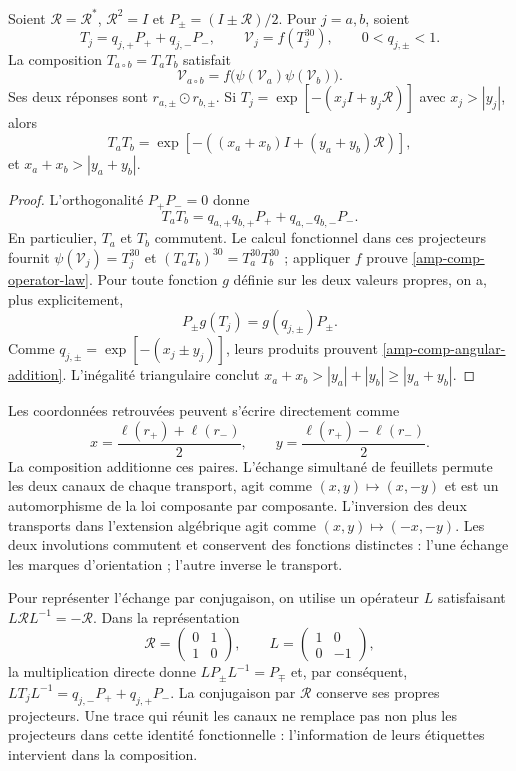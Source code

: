 \begin{proposition}
\label{amp-comp-operator}
Soient $\mathcal R=\mathcal R^*$, $\mathcal R^2=I$ et
$P_\pm=(I\pm\mathcal R)/2$. Pour $j=a,b$, soient
\[
 T_j=q_{j,+}P_++q_{j,-}P_-,\qquad
 \mathcal V_j=f(T_j^{30}),\qquad 0<q_{j,\pm}<1.
\]
La composition $T_{a\circ b}=T_aT_b$ satisfait
\begin{equation}
 \mathcal V_{a\circ b}
 =f\bigl(\psi(\mathcal V_a)\psi(\mathcal V_b)\bigr).
 \label{amp-comp-operator-law}
\end{equation}
Ses deux réponses sont $r_{a,\pm}\odot r_{b,\pm}$. Si
$T_j=\exp[-(x_jI+y_j\mathcal R)]$ avec $x_j>|y_j|$, alors
\begin{equation}
 T_aT_b=
 \exp[-((x_a+x_b)I+(y_a+y_b)\mathcal R)],
 \label{amp-comp-angular-addition}
\end{equation}
et $x_a+x_b>|y_a+y_b|$.
\end{proposition}
\begin{proof}
L’orthogonalité $P_+P_-=0$ donne
\[
 T_aT_b=q_{a,+}q_{b,+}P_++q_{a,-}q_{b,-}P_-.
\]
En particulier, $T_a$ et $T_b$ commutent. Le calcul fonctionnel dans ces
projecteurs fournit
$\psi(\mathcal V_j)=T_j^{30}$ et
$(T_aT_b)^{30}=T_a^{30}T_b^{30}$ ; appliquer $f$ prouve
\eqref{amp-comp-operator-law}. Pour toute fonction $g$ définie sur les
deux valeurs propres, on a, plus explicitement,
\[
 P_\pm g(T_j)=g(q_{j,\pm})P_\pm.
\]
Comme $q_{j,\pm}=\exp[-(x_j\pm y_j)]$, leurs produits prouvent
\eqref{amp-comp-angular-addition}. L’inégalité triangulaire conclut
$x_a+x_b>|y_a|+|y_b|\geq|y_a+y_b|$.
\end{proof}

Les coordonnées retrouvées peuvent s’écrire directement comme
\[
 x=\frac{\ell(r_+)+\ell(r_-)}2,\qquad
 y=\frac{\ell(r_+)-\ell(r_-)}2.
\]
La composition additionne ces paires. L’échange simultané de feuillets
permute les deux canaux de chaque transport, agit comme
$(x,y)\mapsto(x,-y)$ et est un automorphisme de la loi composante par
composante. L’inversion des deux transports dans l’extension algébrique
agit comme $(x,y)\mapsto(-x,-y)$. Les deux involutions commutent et
conservent des fonctions distinctes : l’une échange les marques d’orientation ;
l’autre inverse le transport.

Pour représenter l’échange par conjugaison, on utilise un
opérateur $L$ satisfaisant $L\mathcal R L^{-1}=-\mathcal R$. Dans la
représentation
\[
 \mathcal R=\begin{pmatrix}0&1\\1&0\end{pmatrix},\qquad
 L=\begin{pmatrix}1&0\\0&-1\end{pmatrix},
\]
la multiplication directe donne $LP_\pm L^{-1}=P_\mp$ et, par conséquent,
$LT_jL^{-1}=q_{j,-}P_++q_{j,+}P_-$. La conjugaison par
$\mathcal R$ conserve ses propres projecteurs. Une trace qui réunit les
canaux ne remplace pas non plus les projecteurs dans cette identité fonctionnelle :
l’information de leurs étiquettes intervient dans la composition.

